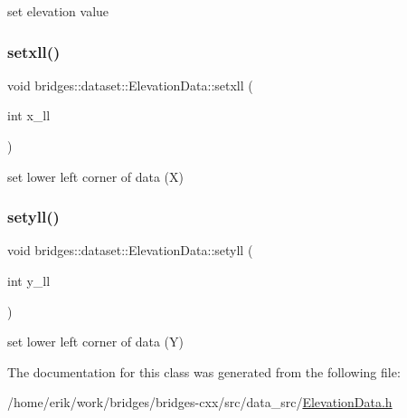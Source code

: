 set elevation value \mbox{\label{classbridges_1_1dataset_1_1_elevation_data_a95e5b02c45c547908612e83641eb386c}} 
\subsubsection{\texorpdfstring{setxll()}{setxll()}}
{\footnotesize\ttfamily void bridges\+::dataset\+::\+Elevation\+Data\+::setxll (\begin{DoxyParamCaption}\item[{int}]{x\+\_\+ll }\end{DoxyParamCaption})\hspace{0.3cm}{\ttfamily [inline]}}

set lower left corner of data (X) \mbox{\label{classbridges_1_1dataset_1_1_elevation_data_a4ea6e380b7cc1531a0ae9b593dd98843}} 
\subsubsection{\texorpdfstring{setyll()}{setyll()}}
{\footnotesize\ttfamily void bridges\+::dataset\+::\+Elevation\+Data\+::setyll (\begin{DoxyParamCaption}\item[{int}]{y\+\_\+ll }\end{DoxyParamCaption})\hspace{0.3cm}{\ttfamily [inline]}}

set lower left corner of data (Y) 

The documentation for this class was generated from the following file\+:\begin{DoxyCompactItemize}
\item 
/home/erik/work/bridges/bridges-\/cxx/src/data\+\_\+src/\hyperlink{_elevation_data_8h}{Elevation\+Data.\+h}\end{DoxyCompactItemize}
